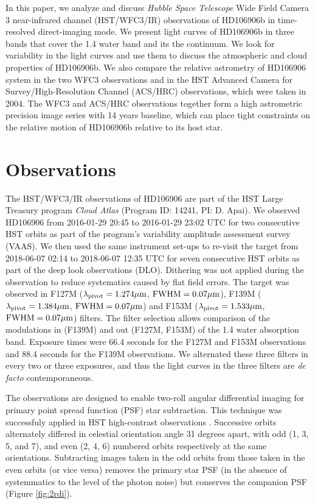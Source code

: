 \documentclass[twocolumn]{aastex62}
\begin{document}
In this paper, we analyze and discuss \emph{Hubble Space Telescope} Wide Field Camera 3 near-infrared channel (HST/WFC3/IR) observations of HD106906b in time-resolved direct-imaging mode. We present light curves of HD106906b in three bands that cover the 1.4\micron{} water band and its the continuum. We look for variability in the light curves and use them to discuss the atmospheric and cloud properties of HD106906b. We also compare the relative astrometry of HD106906 system in the two WFC3 observations and in the HST Advanced Camera for Survey/High-Resolution Channel (ACS/HRC) observations, which were taken in 2004. The WFC3 and ACS/HRC observations together form a high astrometric precision  image series with 14 years baseline,  which can place tight constraints on the relative motion of HD106906b relative to its host star.

\section{Observations}
The HST/WFC3/IR observations of HD106906 are part of the HST Large Treasury program \emph{Cloud Atlas} (Program ID: 14241, PI: D. Apai). We observed HD106906 from 2016-01-29 20:45 to 2016-01-29 23:02 UTC for two consecutive HST orbits as part of the program's variability amplitude assessment survey (VAAS). We then used the same instrument set-ups to re-visit the target from 2018-06-07 02:14 to 2018-06-07 12:35 UTC  for seven consecutive HST orbits as part of the deep look observations (DLO). Dithering was not applied during the observation to reduce systematics caused by flat field errors. The target was observed in F127M ($\lambda_{\mathrm{pivot}}=1.274\mbox{$\mu$m}$, $\mathrm{FWHM}=0.07\mbox{$\mu$m}$), F139M ($\lambda_{\mathrm{pivot}}=1.384\mbox{$\mu$m}$, $\mathrm{FWHM}=0.07\mbox{$\mu$m}$) and F153M ($\lambda_{\mathrm{pivot}}=1.533\mbox{$\mu$m}$, $\mathrm{FWHM}=0.07\mbox{$\mu$m}$) filters.  The filter selection allows comparison of the modulations  in (F139M) and out  (F127M, F153M) of the 1.4 \micron{} water absorption band.  Exposure times were 66.4 seconds for the F127M and F153M observations and 88.4 seconds for the F139M observations. We alternated these three filters in every two or three exposures, and thus the light curves in the three filters are \emph{de facto} {contemporaneous}. 

The observations are designed to enable two-roll angular differential imaging for primary point spread function (PSF) star subtraction.  This technique was successfuly applied in HST high-contrast observations \citep[e.g.,]{Zhou2016,Zhou2019}. {Successive orbits alternately differed in celestial orientation angle 31 degrees apart, with odd (1, 3, 5, and 7), and even (2, 4, 6) numbered orbits respectively at the same orientations.} Subtracting images  taken in the odd orbits from those  taken in the even orbits (or vice versa) removes the primary star PSF (in the absence of systemmatics to the level of the photon noise) but conserves the companion PSF (Figure \ref{fig:2rdi}).  
\end{document}
